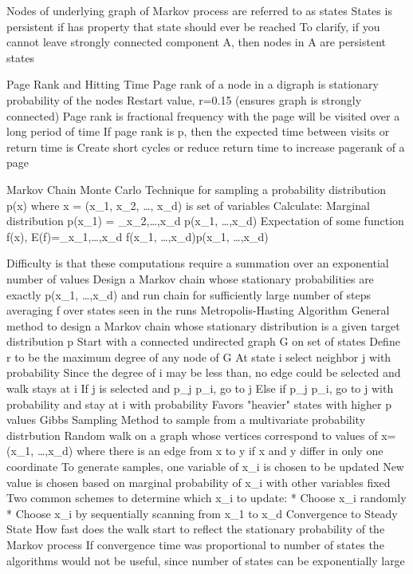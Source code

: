 	Nodes of underlying graph of Markov process are referred to as states
		States is persistent if has property that state should ever be reached
			To clarify, if you cannot leave strongly connected component A, then nodes in A are persistent states

Page Rank and Hitting Time
	Page rank of a node in a digraph is stationary probability of the nodes
		Restart value, r=0.15 (ensures graph is strongly connected)
	Page rank is fractional frequency with the page will be visited over a long period of time
		If page rank is p, then the expected time between visits or return time is 
			Create short cycles or reduce return time to increase pagerank of a page


Markov Chain Monte Carlo
	Technique for sampling a probability distribution p(x) where x = (x_{1}, x_{2}, \dots, x_{d}) is set of variables
		Calculate:
			Marginal distribution p(x_{1}) = \sum_{x_{2},\dots,x_{d}} p(x_{1}, \dots,x_{d})
			Expectation of some function f(x), E(f)=\sum_{x_{1},\dots,x_{d}} f(x_{1}, \dots,x_{d})p(x_{1}, \dots,x_{d})

			Difficulty is that these computations require a summation over an exponential number of values
				Design a Markov chain whose stationary probabilities are exactly p(x_{1}, \dots,x_{d}) and run chain for sufficiently large number of steps averaging f over states seen in the runs
	Metropolis-Hasting Algorithm
		General method to design a Markov chain whose stationary distribution is a given target distribution p
			Start with a connected undirected graph G on set of states
			Define r to be the maximum degree of any node of G
			At state i select neighbor j with probability 
			Since the degree of i may be less than, no edge could be selected and walk stays at i
			If j is selected and p_{j} \geq p_{i}, go to j
			Else if p_{j} \lt p_{i}, go to j with probability  and stay at i with probability 
				Favors "heavier" states with higher p values
	Gibbs Sampling
		Method to sample from a multivariate probability distrbution
			Random walk on a graph whose vertices correspond to values of x=(x_{1}, \dots,x_{d}) where there is an edge from x to y if x and y differ in only one coordinate
			To generate samples, one variable of x_{i} is chosen to be updated
				New value is chosen based on marginal probability of x_{i} with other variables fixed
				Two common schemes to determine which x_{i} to update:
					* Choose x_{i} randomly
					* Choose x_{i} by sequentially scanning from x_{1} to x_{d}
Convergence to Steady State
	How fast does the walk start to reflect the stationary probability of the Markov process
		If convergence time was proportional to number of states the algorithms would not be useful, since number of states can be exponentially large